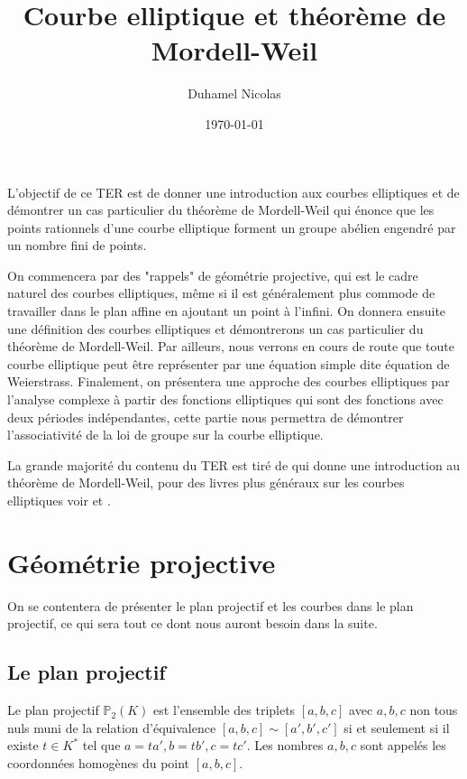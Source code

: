 \documentclass{article}
\begin{document}
\title{Courbe elliptique et théorème de Mordell-Weil}
\date \today
\author{Duhamel Nicolas}
\maketitle


L'objectif de ce TER est de donner une introduction aux courbes elliptiques et de démontrer un cas
particulier du théorème de Mordell-Weil qui énonce que les points rationnels d'une courbe elliptique
forment un groupe abélien engendré par un nombre fini de points.

On commencera par des "rappels" de géométrie projective, qui est le cadre naturel des courbes elliptiques,
même si il est généralement plus commode de travailler dans le plan affine en ajoutant un point à l'infini.
On donnera ensuite une définition des courbes elliptiques et démontrerons un cas particulier du
théorème de Mordell-Weil.
Par ailleurs, nous verrons en cours de route que toute courbe elliptique peut être représenter par
une équation simple dite équation de Weierstrass.
Finalement, on présentera une approche des courbes elliptiques par l'analyse complexe à partir des
fonctions elliptiques qui sont des fonctions avec deux périodes indépendantes, cette partie nous permettra
de démontrer l'associativité de la loi de groupe sur la courbe elliptique.

La grande majorité du contenu du TER est tiré de \cite{silverman_rational_1992} qui donne une introduction au
théorème de Mordell-Weil, pour des livres plus généraux sur les courbes elliptiques voir
\cite{cassels_lectures_1991} et \cite{mckean_elliptic_1999}.

\section{Géométrie projective}
On se contentera de présenter le plan projectif et les courbes dans le plan projectif, ce qui sera
tout ce dont nous auront besoin dans la suite.
\subsection{Le plan projectif}
Le plan projectif $\mathbb{P}_{2}(K)$ est l'ensemble des triplets $[a,b,c]$ avec $a,b,c$ non tous nuls
muni de la relation d'équivalence $[a,b,c] \sim [a',b',c']$ si et seulement si il existe 
$t\in K^{*}$ tel que $a=ta', b=tb', c=tc'$. Les nombres $a,b,c$ sont appelés les coordonnées homogènes
du point $[a,b,c]$.
\end{document}
